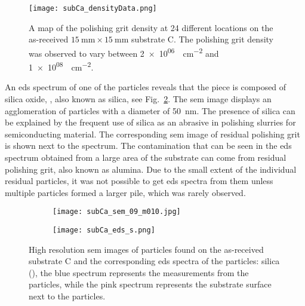 \begin{figure}[htbp]
    \centering
    \texttt{[image: subCa\_densityData.png]}
    \caption[Map of the polishing grit density on the as-received substrate C.]{A map of the polishing grit density at 24 different locations on the as-received $\SI{15}{\milli\metre}\times\SI{15}{\milli\metre}$ substrate C. The polishing grit density was observed to vary between \SI{2e+06}{\particle\centi\metre^{-2}} and \SI{1e+08}{\particle\centi\metre^{-2}}.}
    \label{fig:subCa_densityData}
\end{figure}

An \ac{eds} spectrum of one of the particles reveals that the piece is composed of silica oxide, , also known as silica, see Fig.~\ref{fig:subCa_polishing-grit}. The \ac{sem} image displays an agglomeration of particles with a diameter of \SI{50}{\nano\metre}. The presence of silica can be explained by the frequent use of silica as an abrasive in polishing slurries for semiconducting material. The corresponding \ac{sem} image of residual polishing grit is shown next to the spectrum. The  contamination that can be seen in the \ac{eds} spectrum obtained from a large area of the substrate can come from residual  polishing grit, also known as alumina. Due to the small extent of the individual residual particles, it was not possible to get \ac{eds} spectra from them unless multiple particles formed a larger pile, which was rarely observed.

\begin{figure}
    \centering
    \begin{subfigure}[t]{\textwidth}
          \begin{minipage}[t]{0.4\linewidth}
            \centering
            \texttt{[image: subCa\_sem\_09\_m010.jpg]}
          \end{minipage}
          \hfill
          \begin{minipage}[t]{0.56\linewidth}
            \centering
            \texttt{[image: subCa\_eds\_s.png]}
          \end{minipage}
        \caption{}\label{fig:subCa_polishing-grit}
    \end{subfigure}%
    \caption[\Ac{sem} images and \ac{eds} spectra of particles found on as-received substrate C.]{High resolution \acf{sem} images of particles found on the as-received substrate C and the corresponding \acf{eds} spectra of the particles:  silica (), the blue spectrum represents the measurements from the particles, while the pink spectrum represents the substrate surface next to the particles.}\label{fig:subCa_sem_w_eds}
\end{figure}


